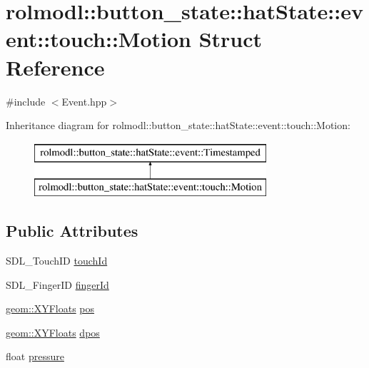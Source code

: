 \hypertarget{structrolmodl_1_1button__state_1_1hat_state_1_1event_1_1touch_1_1_motion}{}\section{rolmodl\+::button\+\_\+state\+::hat\+State\+::event\+::touch\+::Motion Struct Reference}
\label{structrolmodl_1_1button__state_1_1hat_state_1_1event_1_1touch_1_1_motion}


{\ttfamily \#include $<$Event.\+hpp$>$}

Inheritance diagram for rolmodl\+::button\+\_\+state\+::hat\+State\+::event\+::touch\+::Motion\+:\begin{figure}[H]
\begin{center}
\leavevmode
\includegraphics[height=2.000000cm]{structrolmodl_1_1button__state_1_1hat_state_1_1event_1_1touch_1_1_motion}
\end{center}
\end{figure}
\subsection*{Public Attributes}
\begin{DoxyCompactItemize}
\item 
S\+D\+L\+\_\+\+Touch\+ID \mbox{\hyperlink{structrolmodl_1_1button__state_1_1hat_state_1_1event_1_1touch_1_1_motion_aa79f1faff5d9a928bf86c280f3cadc04}{touch\+Id}}
\item 
S\+D\+L\+\_\+\+Finger\+ID \mbox{\hyperlink{structrolmodl_1_1button__state_1_1hat_state_1_1event_1_1touch_1_1_motion_a407fbb140dc40cba1aa8df80507ccec8}{finger\+Id}}
\item 
\mbox{\hyperlink{structrolmodl_1_1geom_1_1_x_y_floats}{geom\+::\+X\+Y\+Floats}} \mbox{\hyperlink{structrolmodl_1_1button__state_1_1hat_state_1_1event_1_1touch_1_1_motion_ad3b78332803f0a26bd2aebc3783b183d}{pos}}
\item 
\mbox{\hyperlink{structrolmodl_1_1geom_1_1_x_y_floats}{geom\+::\+X\+Y\+Floats}} \mbox{\hyperlink{structrolmodl_1_1button__state_1_1hat_state_1_1event_1_1touch_1_1_motion_a18ec5dedc9d9318f03c15f41fa40c0e4}{dpos}}
\item 
float \mbox{\hyperlink{structrolmodl_1_1button__state_1_1hat_state_1_1event_1_1touch_1_1_motion_ac60f6cddf06900191822aa556feb1cae}{pressure}}
\end{DoxyCompactItemize}


